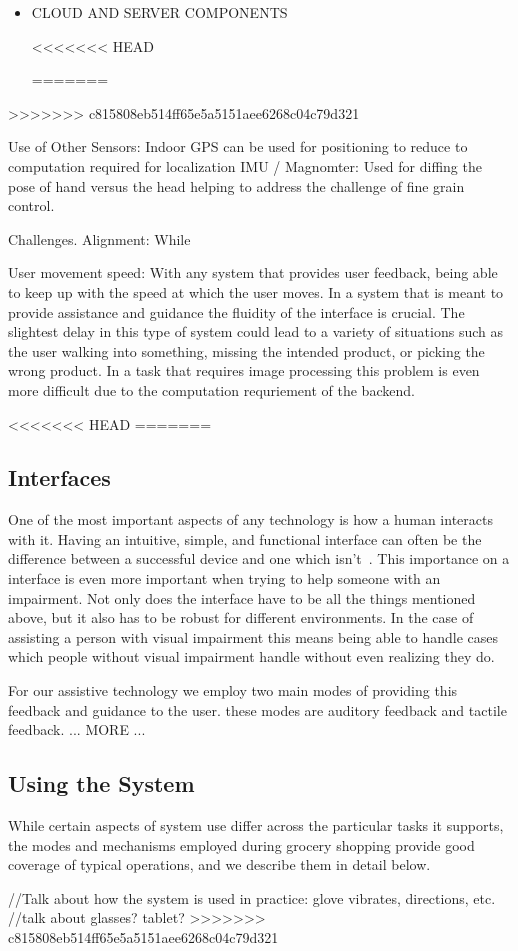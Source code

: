 \begin{itemize}
\item CLOUD AND SERVER COMPONENTS

<<<<<<< HEAD

=======
\end{itemize}
>>>>>>> c815808eb514ff65e5a5151aee6268c04c79d321

Use of Other Sensors:
    Indoor GPS
        can be used for positioning to reduce to computation required for localization
    IMU / Magnomter:
        Used for diffing the pose of hand versus the head helping to address the challenge of fine grain control.


Challenges.
    Alignment:
        While 

    User movement speed:
        With any system that provides user feedback, being able to keep up with the speed at which the user moves. In a system that is meant to provide assistance and guidance the fluidity of the interface is crucial. The slightest delay in this type of system could lead to a variety of situations such as the user walking into something, missing the intended product, or picking the wrong product. In a task that requires image processing this problem is even more difficult due to the computation requriement of the backend.



<<<<<<< HEAD
=======

\subsection{Interfaces}
One of the most important aspects of any technology is how a human
interacts with it. Having an intuitive, simple, and functional
interface can often be the difference between a successful device and
one which isn't~\cite{iPhone}. This importance on a interface is even more important
when trying to help someone with an impairment. Not only does the
interface have to be all the things mentioned above, but it also has
to be robust for different environments. In the case of assisting a
person with visual impairment this means being able to handle cases
which people without visual impairment handle without even realizing
they do.

For our assistive technology we employ two main modes of providing
this feedback and guidance to the user. these modes are auditory
feedback and tactile feedback.  ... MORE ...

\subsection{Using the System}
While certain aspects of system use differ across the particular tasks
it supports, the modes and mechanisms employed during grocery shopping
provide good coverage of typical operations, and we describe them in
detail below.

//Talk about how the system is used in practice: glove vibrates, directions, etc.
//talk about glasses? tablet?
>>>>>>> c815808eb514ff65e5a5151aee6268c04c79d321
